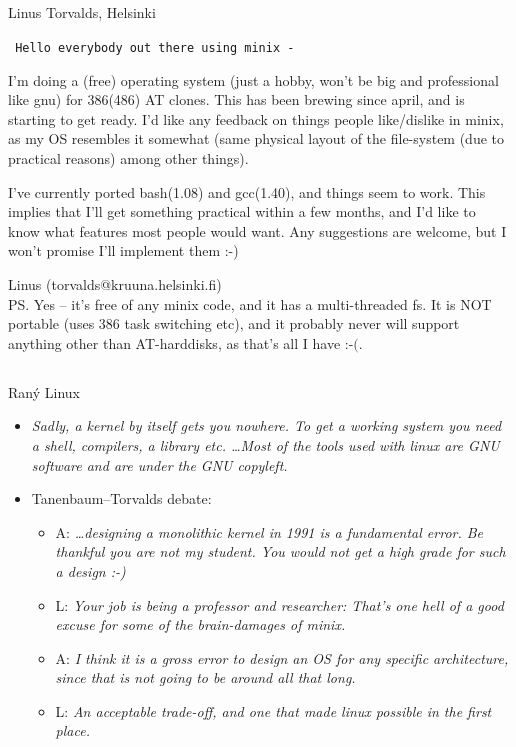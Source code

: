 \documentclass{beamer}
\begin{document}
\subsection{}
\begin{frame}{Linus Torvalds, Helsinki}

{\tt \footnotesize
    Hello everybody out there using minix -

    I'm doing a (free) operating system (just a hobby, won't be big and professional like gnu) for 386(486) AT clones. This has been brewing since april, and is starting to get ready. I'd like any feedback on things people like/dislike in minix, as my OS resembles it somewhat (same physical layout of the file-system (due to practical reasons) among other things).

    I've currently ported bash(1.08) and gcc(1.40), and things seem to work. This implies that I'll get something practical within a few months, and I'd like to know what features most people would want. Any suggestions are welcome, but I won't promise I'll implement them :-)

    Linus (torvalds@kruuna.helsinki.fi) \\
    PS. Yes -- it's free of any minix code, and it has a multi-threaded fs. It is NOT portable (uses 386 task switching etc), and it probably never will support anything other than AT-harddisks, as that's all I have :-$($.
}

\end{frame}

\subsection{}
\begin{frame}{Raný Linux}
\begin{itemize}
\item {\em Sadly, a kernel by itself gets you nowhere. To get a working system you need a shell, compilers, a library etc. \dots Most of the tools used with linux are GNU software and are under the GNU copyleft.}
\item Tanenbaum--Torvalds debate:
\begin{itemize}
\item A: {\em \dots{}designing a monolithic kernel in 1991 is
a fundamental error.  Be thankful you are not my student.  You would not
get a high grade for such a design :-) }
\item L: {\em Your job is being a professor and researcher: That's one hell of a
good excuse for some of the brain-damages of minix. }
\item A: {\em I think it is a gross error to design an OS for any specific architecture, since that is not going to be around all that long. }
\item L: {\em An acceptable trade-off, and one that made linux possible in the first place. }
\end{itemize}
\end{itemize}
\end{frame}
\end{document}
